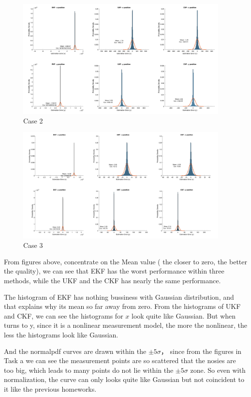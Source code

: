 \begin{figure}[H]
 \centering
 \includegraphics[width=0.95\textwidth]{images/hiscase2.png}
 \caption{Case 2}
 \label{c2}
\end{figure}

\begin{figure}[H]
 \centering
 \includegraphics[width=0.95\textwidth]{images/hiscase3.png}
 \caption{Case 3}
 \label{c3}
\end{figure}

From figures above, concentrate on the Mean value ( the closer to zero, the better the quality), we can see that EKF has the worst performance within three methods, while the UKF and the CKF has nearly the same performance. 

The histogram of EKF has nothing bussiness with Gaussian distribution, and that explains why its mean so far away from zero. From the histograms of UKF and CKF, we can see the histograms for $ x $ look quite like Gaussian. But when turns to y, since it is a nonlinear measurement model, the more the nonlinear, the less the histograms look like Gaussian.

And the normalpdf curves are drawn within the  $ \pm 5 \sigma $， since from the figures in Task a we can see the measurement points are so scattered that the nosies are too big, which leads to many points do not lie within the $ \pm 5 \sigma $ zone. So even with normalization, the curve can only looks quite like Gaussian but not coincident to it like the previous homeworks.